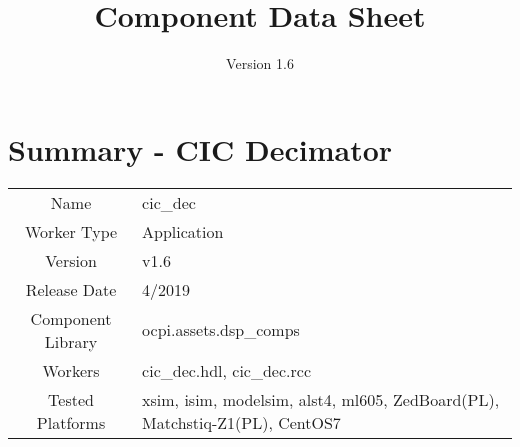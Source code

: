 \iffalse
This file is protected by Copyright. Please refer to the COPYRIGHT file
distributed with this source distribution.

This file is part of OpenCPI <http://www.opencpi.org>

OpenCPI is free software: you can redistribute it and/or modify it under the
terms of the GNU Lesser General Public License as published by the Free Software
Foundation, either version 3 of the License, or (at your option) any later
version.

OpenCPI is distributed in the hope that it will be useful, but WITHOUT ANY
WARRANTY; without even the implied warranty of MERCHANTABILITY or FITNESS FOR A
PARTICULAR PURPOSE. See the GNU Lesser General Public License for more details.

You should have received a copy of the GNU Lesser General Public License along
with this program. If not, see <http://www.gnu.org/licenses/>.
\fi
\def\importpath{}

\def\docTitle{Component Data Sheet}
\def\docVersion{1.6}
\date{Version \docVersion} %
\title{\docTitle}
\lhead{\small{\docTitle}}

\def\comp{cic\_dec}
\edef\ecomp{cic_dec}
\def\Comp{CIC Decimator}
\graphicspath{ {figures/} }



\section*{Summary - \Comp}
\begin{tabular}{|c|M{13.5cm}|}
	\hline
	                  &                                                    \\
	\hline
	Name              & \comp                                              \\
	\hline
	Worker Type       & Application                                        \\
	\hline
	Version           & v\docVersion \\
	\hline
	Release Date      & 4/2019 \\
	\hline
	Component Library & ocpi.assets.dsp\_comps                              \\
	\hline
	Workers           & \comp.hdl, \comp.rcc                                          \\
	\hline
	Tested Platforms  & xsim, isim, modelsim, alst4, ml605, ZedBoard(PL), Matchstiq-Z1(PL), CentOS7 \\
	\hline
\end{tabular}


